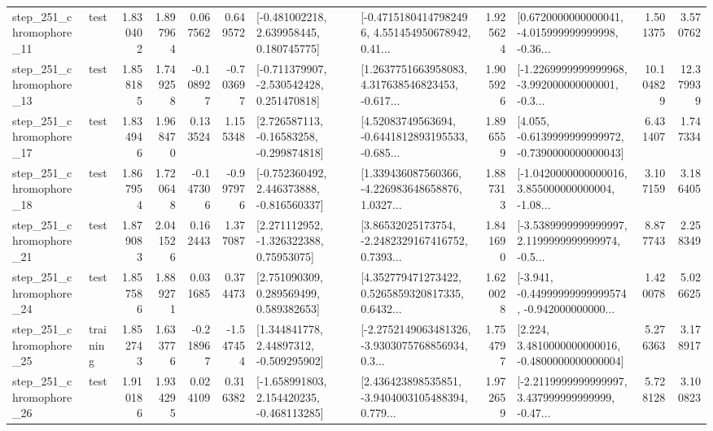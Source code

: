 \begin{tabular}{llrrrrllrlrr}
  step\_251\_chromophore\_11 &      test &      1.830402 &    1.897964 &      0.067562 &  0.649572 &    [-0.481002218, 2.639958445, 0.180745775] &  [-0.47151804147982496, 4.551454950678942, 0.41... &       1.925624 &  [0.6720000000000041, -4.015999999999998, -0.36... &            1.501375 &          3.570762 \\
  step\_251\_chromophore\_13 &      test &      1.858185 &    1.749258 &     -0.108927 & -0.703697 &   [-0.711379907, -2.530542428, 0.251470818] &  [1.2637751663958083, 4.317638546823453, -0.617... &       1.905926 &  [-1.2269999999999968, -3.992000000000001, -0.3... &           10.104829 &         12.379939 \\
  step\_251\_chromophore\_17 &      test &      1.834946 &    1.968470 &      0.133524 &  1.155348 &    [2.726587113, -0.16583258, -0.299874818] &  [4.52083749563694, -0.6441812893195533, -0.685... &       1.896559 &  [4.055, -0.6139999999999972, -0.7390000000000043] &            6.431407 &          1.747334 \\
  step\_251\_chromophore\_18 &      test &      1.867954 &    1.720648 &     -0.147306 & -0.997976 &   [-0.752360492, 2.446373888, -0.816560337] &  [1.339436087560366, -4.226983648658876, 1.0327... &       1.887313 &  [-1.0420000000000016, 3.855000000000004, -1.08... &            3.107159 &          3.186405 \\
  step\_251\_chromophore\_21 &      test &      1.879083 &    2.041526 &      0.162443 &  1.377087 &     [2.271112952, -1.326322388, 0.75953075] &  [3.86532025173754, -2.2482329167416752, 0.7393... &       1.841690 &  [-3.5389999999999997, 2.1199999999999974, -0.5... &            8.877743 &          2.258349 \\
  step\_251\_chromophore\_24 &      test &      1.857586 &    1.889271 &      0.031685 &  0.374473 &     [2.751090309, 0.289569499, 0.589382653] &  [4.352779471273422, 0.5265859320817335, 0.6432... &       1.620028 &  [-3.941, -0.44999999999999574, -0.942000000000... &            1.420078 &          5.026625 \\
  step\_251\_chromophore\_25 &  training &      1.852743 &    1.633776 &     -0.218967 & -1.547454 &     [1.344841778, 2.44897312, -0.509295902] &  [-2.2752149063481326, -3.9303075768856934, 0.3... &       1.754797 &   [2.224, 3.4810000000000016, -0.4800000000000004] &            5.276363 &          3.178917 \\
  step\_251\_chromophore\_26 &      test &      1.910186 &    1.934295 &      0.024109 &  0.316382 &   [-1.658991803, 2.154420235, -0.468113285] &  [2.436423898535851, -3.9404003105488394, 0.779... &       1.972659 &  [-2.2119999999999997, 3.437999999999999, -0.47... &            5.728128 &          3.100823 \\

\end{tabular}
